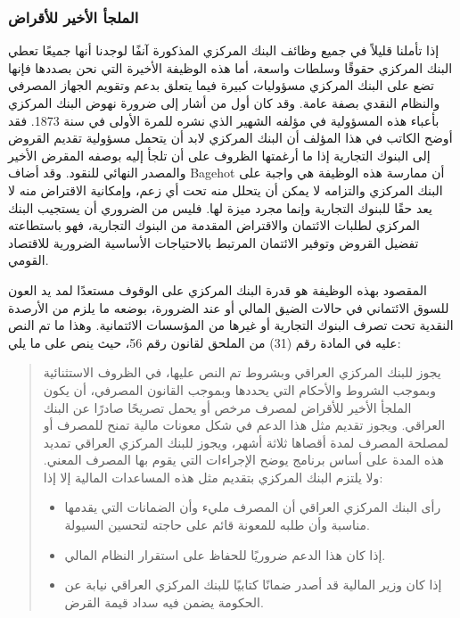 \documentclass[10pt,a4paper]{report}
\begin{document}
\begin{doublespacing}
\subsubsection{الملجأ الأخير للأقراض}
إذا تأملنا قليلاً في جميع وظائف البنك المركزي المذكورة آنفًا لوجدنا أنها جميعًا تعطي البنك المركزي حقوقًا وسلطات واسعة، أما هذه الوظيفة الأخيرة التي نحن بصددها فإنها تضع على البنك المركزي مسؤوليات كبيرة فيما يتعلق بدعم وتقويم الجهاز المصرفي والنظام النقدي بصفة عامة. وقد كان  أول من أشار إلى ضرورة نهوض البنك المركزي بأعباء هذه المسؤولية في مؤلفه الشهير  الذي نشره للمرة الأولى في سنة 1873. فقد أوضح الكاتب في هذا المؤلف أن البنك المركزي لابد أن يتحمل مسؤولية تقديم القروض إلى البنوك التجارية إذا ما أرغمتها الظروف على أن تلجأ إليه بوصفه المقرض الأخير والمصدر النهائي للنقود. وقد أضاف Bagehot أن ممارسة هذه الوظيفة هي واجبة على البنك المركزي والتزامه لا يمكن أن يتحلل منه تحت أي زعم، وإمكانية الاقتراض منه لا يعد حقًا للبنوك التجارية وإنما مجرد ميزة لها. فليس من الضروري أن يستجيب البنك المركزي لطلبات الائتمان والاقتراض المقدمة من البنوك التجارية، فهو باستطاعته تفضيل القروض وتوفير الائتمان المرتبط بالاحتياجات الأساسية الضرورية للاقتصاد القومي. 

المقصود بهذه الوظيفة هو قدرة البنك المركزي على الوقوف مستعدًا لمد يد العون للسوق الائتماني في حالات الضيق المالي أو عند الضرورة، بوضعه ما يلزم من الأرصدة النقدية تحت تصرف البنوك التجارية أو غيرها من المؤسسات الائتمانية. وهذا ما تم النص عليه في المادة رقم (31) من الملحق لقانون رقم 56، حيث ينص على ما يلي: 
\begin{quote}
	{يجوز للبنك المركزي العراقي وبشروط تم النص عليها، في الظروف الاستثنائية وبموجب الشروط والأحكام التي يحددها وبموجب القانون المصرفي، أن يكون الملجأ الأخير للأقراض لمصرف مرخص أو يحمل تصريحًا صادرًا عن البنك العراقي. ويجوز تقديم مثل هذا الدعم في شكل معونات مالية تمنح للمصرف أو لمصلحة المصرف لمدة أقصاها ثلاثة أشهر، ويجوز للبنك المركزي العراقي تمديد هذه المدة على أساس برنامج يوضح الإجراءات التي يقوم بها المصرف المعني. ولا يلتزم البنك المركزي بتقديم مثل هذه المساعدات المالية إلا إذا:}
	
	\begin{itemize}
		\item رأى البنك المركزي العراقي أن المصرف مليء وأن الضمانات التي يقدمها مناسبة وأن طلبه للمعونة قائم على حاجته لتحسين السيولة.
		\item إذا كان هذا الدعم ضروريًا للحفاظ على استقرار النظام المالي.
		\item إذا كان وزير المالية قد أصدر ضمانًا كتابيًا للبنك المركزي العراقي نيابة عن الحكومة يضمن فيه سداد قيمة القرض.
	\end{itemize}
\end{quote}


\end{doublespacing}
\end{document}

